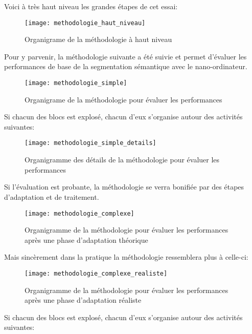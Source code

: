 \par Voici à très haut niveau les grandes étapes de cet essai:
\label{methodologie_haut_niveau}
\begin{figure}
    \centering
    \texttt{[image: methodologie\_haut\_niveau]}
    \caption{Organigrame de la méthodologie à haut niveau}
    \label{fig:methodologie_haut_niveau}
\end{figure}
\par Pour y parvenir, la méthodologie suivante a été suivie et permet d'évaluer les performances de base de la segmentation sémantique avec le nano-ordinateur.
\label{methodologie_simple}
\begin{figure}
    \centering
    \texttt{[image: methodologie\_simple]}
    \caption{Organigrame de la méthodologie pour évaluer les performances}
    \label{fig:methodologie_simple}
\end{figure}
\par Si chacun des blocs est explosé, chacun d'eux s'organise autour des activités suivantes: 
\label{methodologie_simple_details}
\begin{figure}
    \centering
    \texttt{[image: methodologie\_simple\_details]}
    \caption{Organigramme des détails de la méthodologie pour évaluer les performances}
    \label{fig:methodologie_simple_details}
\end{figure}
\par Si l'évaluation est probante, la méthodologie se verra bonifiée par des étapes d'adaptation et de traitement. 
\label{methodologie_complexe}
\begin{figure}
    \centering
    \texttt{[image: methodologie\_complexe]}
    \caption{Organigramme de la méthodologie pour évaluer les performances après une phase d'adaptation théorique}
    \label{fig:methodologie_complexe}
\end{figure}
\par Mais sincèrement dans la pratique la méthodologie ressemblera plus à celle-ci: 
\label{methodologie_complexe_realiste}
\begin{figure}
    \centering
    \texttt{[image: methodologie\_complexe\_realiste]}
    \caption{Organigramme de la méthodologie pour évaluer les performances après une phase d'adaptation réaliste}
    \label{fig:methodologie_complexe_realiste}
\end{figure}
\par Si chacun des blocs est explosé, chacun d'eux s'organise autour des activités suivantes: 

